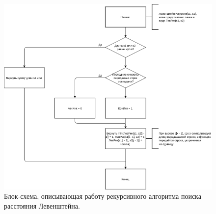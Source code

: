 \documentclass[12pt]{report}
\begin{document}
\begin{figure}
\begin{center}
\includegraphics[scale=0.75]{inc/img/LevRec.png}{}
\captionsetup{justification=centering}
	\caption{Блок-схема, описывающая работу рекурсивного алгоритма поиска расстояния Левенштейна.}
	\label{KC:1}
\end{center}
\end{figure}
\end{document}
